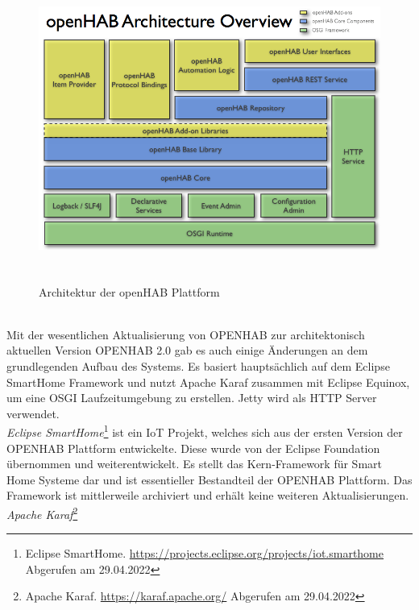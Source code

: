     \begin{figure}[hbt!]
        \centering
        \includegraphics[width=15cm,height=10cm,keepaspectratio]{images/openhab-architecture.png}
        \caption{Architektur der openHAB Plattform \cite{openHAB-architecture2013}}
        \label{fig:architectureopenHAB}
    \end{figure}
    \\
    \linebreak
    Mit der wesentlichen Aktualisierung von \acs{OPENHAB} zur architektonisch aktuellen Version \acs{OPENHAB} 2.0 gab es auch einige Änderungen an dem 
    grundlegenden Aufbau des Systems. Es basiert hauptsächlich auf dem Eclipse SmartHome Framework und nutzt Apache Karaf zusammen mit 
    Eclipse Equinox, um eine \acs{OSGI} Laufzeitumgebung zu erstellen. Jetty wird als \acs{HTTP} Server verwendet. 
    \\
    \linebreak
    \textit{Eclipse SmartHome}\footnote{Eclipse SmartHome. \url{https://projects.eclipse.org/projects/iot.smarthome} Abgerufen am 29.04.2022} 
    ist ein \acs{IoT} Projekt, welches sich aus der ersten Version der \acs{OPENHAB} Plattform entwickelte. 
    Diese wurde von der Eclipse Foundation übernommen und weiterentwickelt. Es stellt das Kern-Framework für Smart Home Systeme dar 
    und ist essentieller Bestandteil der \acs{OPENHAB} Plattform. Das Framework ist mittlerweile archiviert und erhält keine weiteren 
    Aktualisierungen.
    \\
    \linebreak
    \textit{Apache Karaf}\footnote{Apache Karaf. \url{https://karaf.apache.org/} Abgerufen am 29.04.2022} 
